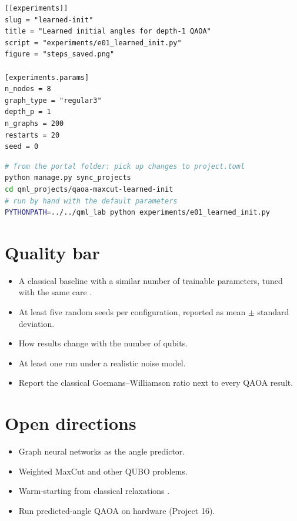 \documentclass[11pt,a4paper]{article}
\begin{document}
\begin{lstlisting}[language={}]
[[experiments]]
slug = "learned-init"
title = "Learned initial angles for depth-1 QAOA"
script = "experiments/e01_learned_init.py"
figure = "steps_saved.png"

[experiments.params]
n_nodes = 8
graph_type = "regular3"
depth_p = 1
n_graphs = 200
restarts = 20
seed = 0
\end{lstlisting}

\begin{lstlisting}[language=bash]
# from the portal folder: pick up changes to project.toml
python manage.py sync_projects
cd qml_projects/qaoa-maxcut-learned-init
# run by hand with the default parameters
PYTHONPATH=../../qml_lab python experiments/e01_learned_init.py
\end{lstlisting}

\section{Quality bar}
\begin{itemize}
  \item A classical baseline with a similar number of trainable parameters, tuned with the same care \citep{bowles2024}.
  \item At least five random seeds per configuration, reported as mean $\pm$ standard deviation.
  \item How results change with the number of qubits.
  \item At least one run under a realistic noise model.
  \item Report the classical Goemans--Williamson ratio next to every QAOA result.
\end{itemize}

\section{Open directions}
\begin{itemize}
  \item Graph neural networks as the angle predictor.
  \item Weighted MaxCut and other QUBO problems.
  \item Warm-starting from classical relaxations \citep{egger2021}.
  \item Run predicted-angle QAOA on hardware (Project 16).
\end{itemize}
\end{document}
